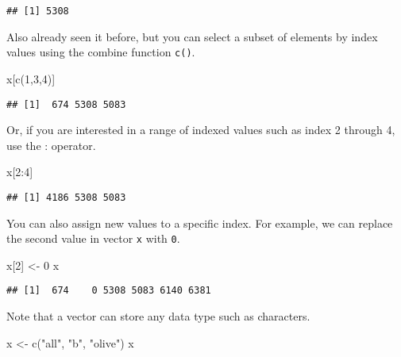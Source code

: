 \documentclass[
]{article}
\newenvironment{Shaded}{\begin{snugshade}}{\end{snugshade}}
\newcommand{\DecValTok}[1]{\textcolor[rgb]{0.00,0.00,0.81}{#1}}
\newcommand{\FunctionTok}[1]{\textcolor[rgb]{0.00,0.00,0.00}{#1}}
\newcommand{\NormalTok}[1]{#1}
\newcommand{\OtherTok}[1]{\textcolor[rgb]{0.56,0.35,0.01}{#1}}
\newcommand{\SpecialCharTok}[1]{\textcolor[rgb]{0.00,0.00,0.00}{#1}}
\newcommand{\StringTok}[1]{\textcolor[rgb]{0.31,0.60,0.02}{#1}}
\begin{document}
\begin{verbatim}
## [1] 5308
\end{verbatim}

Also already seen it before, but you can select a subset of elements by
index values using the combine function \texttt{c()}.

\begin{Shaded}
\begin{Highlighting}[]
\NormalTok{x[}\FunctionTok{c}\NormalTok{(}\DecValTok{1}\NormalTok{,}\DecValTok{3}\NormalTok{,}\DecValTok{4}\NormalTok{)]}
\end{Highlighting}
\end{Shaded}

\begin{verbatim}
## [1]  674 5308 5083
\end{verbatim}

Or, if you are interested in a range of indexed values such as index 2
through 4, use the : operator.

\begin{Shaded}
\begin{Highlighting}[]
\NormalTok{x[}\DecValTok{2}\SpecialCharTok{:}\DecValTok{4}\NormalTok{]}
\end{Highlighting}
\end{Shaded}

\begin{verbatim}
## [1] 4186 5308 5083
\end{verbatim}

You can also assign new values to a specific index. For example, we can
replace the second value in vector \texttt{x} with \texttt{0}.

\begin{Shaded}
\begin{Highlighting}[]
\NormalTok{x[}\DecValTok{2}\NormalTok{] }\OtherTok{\textless{}{-}} \DecValTok{0}
\NormalTok{x}
\end{Highlighting}
\end{Shaded}

\begin{verbatim}
## [1]  674    0 5308 5083 6140 6381
\end{verbatim}

Note that a vector can store any data type such as characters.

\begin{Shaded}
\begin{Highlighting}[]
\NormalTok{x }\OtherTok{\textless{}{-}} \FunctionTok{c}\NormalTok{(}\StringTok{"all"}\NormalTok{, }\StringTok{"b"}\NormalTok{, }\StringTok{"olive"}\NormalTok{)}
\NormalTok{x}
\end{Highlighting}
\end{Shaded}
\end{document}
